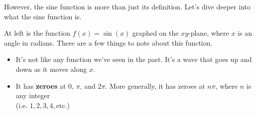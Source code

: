 However, the sine function is more than just its definition. Let's dive deeper into what the sine function is.
\begin{center}
    \begin{minipage}[c]{0.33\linewidth}
    \end{minipage}
    \begin{minipage}[c]{0.66\textwidth}
        At left is the function $f(x) = \sin(x)$ graphed on the $xy$-plane, where $x$ is an angle in radians. There are a few things to note about this function.
        \begin{itemize}
            \item It's not like any function we've seen in the past. It's a wave that goes up and down as it moves along $x$.
            \item It has \textbf{zeroes} at $0$, $\pi$, and $2\pi$. More generally, it has zeroes at $n\pi$, where $n$ is any integer\\
            (i.e. $1,2,3,4,\text{etc.}$)
        \end{itemize}
    \end{minipage}
\end{center}
